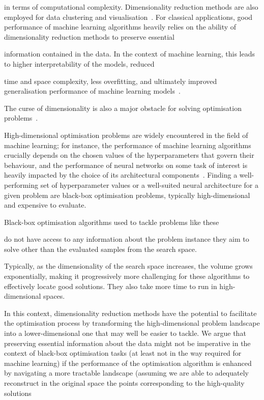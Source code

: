 in terms of computational complexity. 
Dimensionality reduction methods are also employed for data clustering and visualisation~\citep{VanHin08}.
For classical applications, good performance of machine learning algorithms heavily relies on the ability of dimensionality reduction methods to preserve essential 

information contained in the data.
In the context of machine learning, this leads to higher interpretability of the models, reduced 

time and space complexity, less overfitting, and ultimately improved generalisation performance of machine learning models~\citep{JiaEtAl22}.

The curse of dimensionality is also a major obstacle for solving optimisation problems~\citep{Garnett23}. 

High-dimensional optimisation problems are widely encountered in the field of machine learning; for instance, the performance of machine learning algorithms crucially depends on the chosen values of the hyperparameters that govern their behaviour, and the performance of neural networks on some task of interest is heavily impacted by the choice of its architectural components~\cite{ElsEtAl19}.
Finding a well-performing set of hyperparameter values or a well-suited neural architecture for a given problem are  black-box optimisation problems, typically high-dimensional and expensive to evaluate.


Black-box optimisation algorithms used to tackle problems like these




do not have access to any information about the problem instance they aim to solve other than the evaluated samples from the search space. 

Typically, as the dimensionality of the search space increases, the volume grows exponentially, making it progressively more challenging for these algorithms to effectively locate good solutions. They also take more time to run in high-dimensional spaces.

In this context, dimensionality reduction methods have the potential to facilitate the optimisation process by transforming the high-dimensional problem landscape into a lower-dimensional one that may well be easier to tackle. 
We argue that preserving essential information about the data might not be imperative in the context of  black-box optimisation tasks (at least not in the way required for machine learning) if the performance of the optimisation algorithm is enhanced by navigating a more tractable landscape (assuming we are able to adequately reconstruct in the original space the points corresponding to the high-quality solutions 


